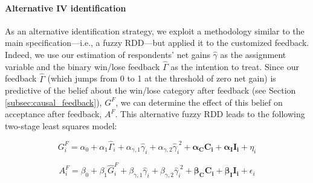 \documentclass[12pt]{article} %
\begin{document}
\paragraph{Alternative IV identification}
As an alternative identification strategy, we exploit a methodology similar to the main specification---i.e., a fuzzy RDD---but applied it to the customized feedback. Indeed, we use our estimation of respondents' net gains $\widehat{\gamma}$ as the assignment variable and the binary win/lose feedback $\widehat{\Gamma}$ as the intention to treat. Since our feedback $\widehat{\Gamma}$ (which jumps from 0 to 1 at the threshold of zero net gain) is predictive of the belief about the win/lose category after feedback (see Section \ref{subsec:causal_feedback}), $G^F$, we can determine the effect of this belief on acceptance after feedback, $A^F$. This alternative fuzzy RDD leads to the following two-stage least squares model:






\begin{equation}
    G_i^F = \alpha_0 + \alpha_1 \widehat{\Gamma}_{i} + \alpha_{\gamma,1} \widehat{\gamma}_{i} + \alpha_{\gamma,2} \widehat{\gamma}_{i}^{\;2} + \mathbf{\alpha_C C_i} + \mathbf{\alpha_I I_i} + \eta_i
    \label{eq:first_stage_parametric_rdd_approve_winner_feedback}
\end{equation}

\vspace{-.0cm}

\begin{equation}
    A_i^F = \beta_0 + \beta_1 \widehat{G}_i^F + \beta_{\gamma,1} \widehat{\gamma}_{i} + \beta_{\gamma,2} \widehat{\gamma}_{i}^{\;2} + \mathbf{\beta_C C_i} + \mathbf{\beta_I I_i} + \epsilon_i
    \label{eq:second_stage_feed_with_rdd_approve_winner}
\end{equation}
\end{document}

